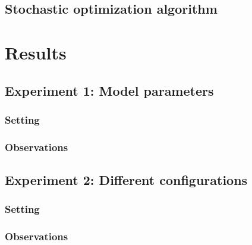 \documentclass[11pt]{article}
\begin{document}
\subsection{Stochastic optimization algorithm}


\section{Results}

\subsection{Experiment 1: Model parameters}

\subsubsection{Setting}

\subsubsection{Observations}

\subsection{Experiment 2: Different configurations}

\subsubsection{Setting}

\subsubsection{Observations}
\end{document}
